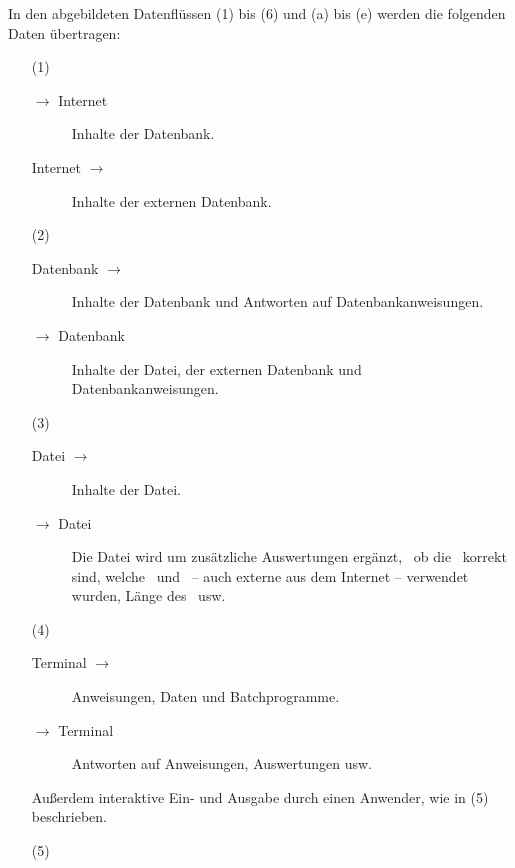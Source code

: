 In den  abgebildeten Datenflüssen (1) bis (6) und (a) bis (e) werden die folgenden Daten übertragen:
\begin{itemize}
	\newcommand*{\vonnach}  [2]{#1 $\rightarrow$ #2}
	\newcommand*{\nachvon}  [2]{\vonnach{#2}{#1}}
	\newcommand*{\hinundher}[2]{#1 $\leftrightarrow$ #2}
	\item[(1)]\label{dat:Internet}
	\begin{description}
		\item[\vonnach{\ASBA}{Internet}]\label{dat:ausInternet}
		Inhalte der Datenbank.
		\item[\nachvon{\ASBA}{Internet}]\label{dat:inInternet}
		Inhalte der externen Datenbank.
	\end{description}
	\item[(2)]\label{dat:Datenbank}
	\begin{description}
		\item[\vonnach{Datenbank}{\ASBA}]\label{dat:ausDatenbank}
		Inhalte der Datenbank und Antworten auf Datenbankanweisungen.
		\item[\nachvon{Datenbank}{\ASBA}]\label{dat:inDatenbank}
		Inhalte der Datei, der externen Datenbank und Datenbankanweisungen.
	\end{description}
	\item[(3)]\label{dat:Datei}
	\begin{description}
		\item[\vonnach{Datei}{\ASBA}]\label{dat:ausDatei}
		Inhalte der Datei.
		\item[\nachvon{Datei}{\ASBA}]\label{dat:inDatei}
		Die Datei wird um zusätzliche Auswertungen ergänzt, \textzB\ ob die \Beweise\ korrekt sind, welche \Axiome\ und \Saetze\ -- auch externe aus dem Internet -- verwendet wurden, Länge des \Beweises\ usw.
	\end{description}
	\item[(4)]\label{dat:Terminal}
	\begin{description}
		\item[\vonnach{Terminal}{\ASBA}]\label{dat:ausTerminal}
		Anweisungen, Daten und Batchprogramme.
		\item[\nachvon{Terminal}{\ASBA}]\label{dat:inTerminal}
		Antworten auf Anweisungen, Auswertungen usw.
	\end{description}
	Außerdem interaktive Ein- und Ausgabe durch einen Anwender, wie in (5) beschrieben.
	\item[(5)]\label{dat:Anwender}
	\begin{description}

\end{description}
\end{itemize}
